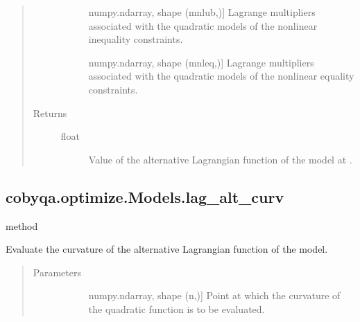 \documentclass[letterpaper,10pt,english]{sphinxmanual}
\begin{document}
\begin{fulllineitems}
\begin{fulllineitems}
\begin{quote}
\begin{description}
\begin{description}
\item[{}] \leavevmode{[}numpy.ndarray, shape (mnlub,){]}
\sphinxAtStartPar
Lagrange multipliers associated with the quadratic models of the
nonlinear inequality constraints.

\item[{}] \leavevmode{[}numpy.ndarray, shape (mnleq,){]}
\sphinxAtStartPar
Lagrange multipliers associated with the quadratic models of the
nonlinear equality constraints.

\end{description}

\item[{Returns}] \leavevmode\begin{description}
\item[{float}] \leavevmode
\sphinxAtStartPar
Value of the alternative Lagrangian function of the model at .

\end{description}

\end{description}\end{quote}

\end{fulllineitems}



\subsection{cobyqa.optimize.Models.lag\_alt\_curv}
\label{\detokenize{refs/generated/cobyqa.optimize.Models.lag_alt_curv:cobyqa-optimize-models-lag-alt-curv}}\label{\detokenize{refs/generated/cobyqa.optimize.Models.lag_alt_curv::doc}}
\sphinxAtStartPar
method

\begin{fulllineitems}
\label{\detokenize{refs/generated/cobyqa.optimize.Models.lag_alt_curv:cobyqa.optimize.Models.lag_alt_curv}}
\sphinxAtStartPar
Evaluate the curvature of the alternative Lagrangian function of the
model.
\begin{quote}\begin{description}
\item[{Parameters}] \leavevmode\begin{description}
\item[{}] \leavevmode{[}numpy.ndarray, shape (n,){]}
\sphinxAtStartPar
Point at which the curvature of the quadratic function is to be
evaluated.


\end{description}
\end{description}
\end{quote}
\end{fulllineitems}
\end{fulllineitems}
\end{document}
